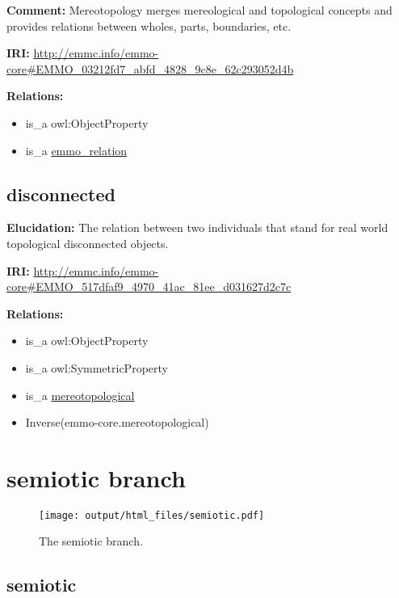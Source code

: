 \documentclass[a4paper,]{report}
\providecommand{\tightlist}{%
  \setlength{\itemsep}{0pt}\setlength{\parskip}{0pt}}
\begin{document}
\textbf{Comment:} Mereotopology merges mereological and topological
concepts and provides relations between wholes, parts, boundaries, etc.

\textbf{IRI:}
\url{http://emmc.info/emmo-core\#EMMO_03212fd7_abfd_4828_9c8e_62c293052d4b}

\textbf{Relations:}

\begin{itemize}
\tightlist
\item
  is\_a owl:ObjectProperty
\item
  is\_a \protect\hyperlink{emmo_relation}{emmo\_relation}
\end{itemize}

\hypertarget{disconnected}{%
\subsection{disconnected}\label{disconnected}}

\textbf{Elucidation:} The relation between two individuals that stand
for real world topological disconnected objects.

\textbf{IRI:}
\url{http://emmc.info/emmo-core\#EMMO_517dfaf9_4970_41ac_81ee_d031627d2c7c}

\textbf{Relations:}

\begin{itemize}
\tightlist
\item
  is\_a owl:ObjectProperty
\item
  is\_a owl:SymmetricProperty
\item
  is\_a \protect\hyperlink{mereotopological}{mereotopological}
\item
  Inverse(emmo-core.mereotopological)
\end{itemize}

\hypertarget{semiotic-branch}{%
\section{semiotic branch}\label{semiotic-branch}}

\begin{figure}
\centering
\texttt{[image: output/html\_files/semiotic.pdf]}
\caption{The semiotic branch.}
\end{figure}

\hypertarget{semiotic}{%
\subsection{semiotic}\label{semiotic}}
\end{document}

